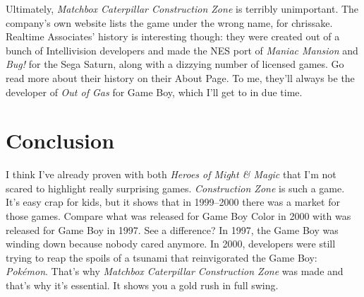 \documentclass{book}
\begin{document}
Ultimately, \emph{Matchbox Caterpillar Construction Zone} is terribly unimportant. The company’s own website lists the game under the wrong name, for chrissake. Realtime Associates’ history is interesting though: they were created out of a bunch of Intellivision developers and made the NES port of \emph{Maniac Mansion} and \emph{Bug!} for the Sega Saturn, along with a dizzying number of licensed games. Go read more about their history on their About Page. To me, they’ll always be the developer of \emph{Out of Gas} for Game Boy, which I’ll get to in due time.\par
\FloatBarrier\section*{Conclusion}
I think I’ve already proven with both \emph{Heroes of Might \& Magic} that I’m not scared to highlight really surprising games. \emph{Construction Zone} is such a game. It’s easy crap for kids, but it shows that in 1999–2000 there was a market for those games. Compare what was released for Game Boy Color in 2000 with was released for Game Boy in 1997. See a difference? In 1997, the Game Boy was winding down because nobody cared anymore. In 2000, developers were still trying to reap the spoils of a tsunami that reinvigorated the Game Boy: \emph{Pokémon}. That’s why \emph{Matchbox Caterpillar Construction Zone} was made and that’s why it’s essential. It shows you a gold rush in full swing.\par
\FloatBarrier\vspace{\baselineskip}\begin{figure}[H]\end{figure}
\end{document}
